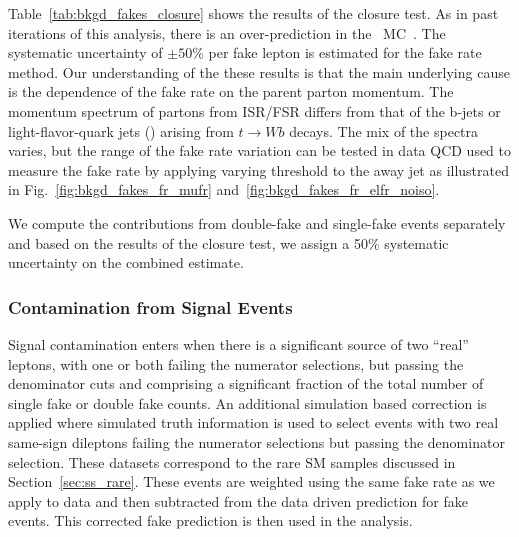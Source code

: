 Table~\ref{tab:bkgd_fakes_closure} shows the results of the closure test.
As in past iterations of this analysis, there is an over-prediction in
the \ttbar~MC~\cite{sspaper2010,sspaper2011}. The systematic uncertainty
of $\pm50\%$ per fake lepton is estimated for the fake rate method. Our
understanding of the these results is that the main underlying cause
is the dependence of the fake rate on the parent parton momentum. The
momentum spectrum of partons from ISR/FSR differs from that of the b-jets
or light-flavor-quark jets (\Wqq) arising from $t\to W b$ decays. The
mix of the spectra varies, but the range of the fake rate variation can
be tested in data QCD used to measure the fake rate by applying varying
threshold to the away jet as illustrated in Fig.~\ref{fig:bkgd_fakes_fr_mufr}
and~\ref{fig:bkgd_fakes_fr_elfr_noiso}.

We compute the contributions from double-fake and single-fake events separately
and based on the results of the closure test, we assign a 50\% systematic
uncertainty on the combined estimate.

\subsubsection{Contamination from Signal Events}
\label {sec:bkgd_fakes_sc}

Signal contamination enters when there is a significant source of two ``real''
leptons, with one or both failing the numerator selections, but passing the
denominator cuts and comprising a significant fraction of the total number of
single fake or double fake counts. An additional simulation based correction
is applied where simulated truth information is used to select events with
two real same-sign dileptons failing the numerator selections but passing the
denominator selection. These datasets correspond to the rare SM samples discussed
in Section~\ref{sec:ss_rare}. These events are weighted using the same fake rate
as we apply to data and then subtracted from the data driven prediction for
fake events. This corrected fake prediction is then used in the analysis.


